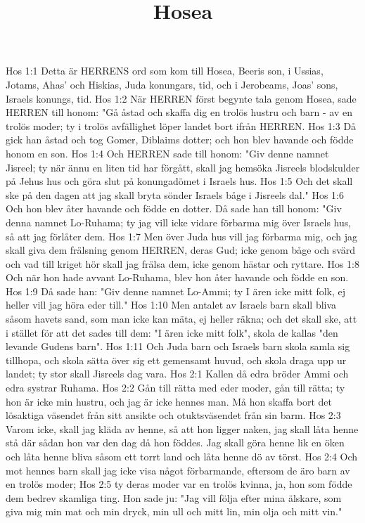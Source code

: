 

\title{Hosea}

Hos 1:1  Detta är HERRENS ord som kom till Hosea, Beeris son, i Ussias, Jotams, Ahas' och Hiskias, Juda konungars, tid, och i Jerobeams, Joas' sons, Israels konungs, tid.
Hos 1:2  När HERREN först begynte tala genom Hosea, sade HERREN till honom: "Gå åstad och skaffa dig en trolös hustru och barn - av en trolös moder; ty i trolös avfällighet löper landet bort ifrån HERREN.
Hos 1:3  Då gick han åstad och tog Gomer, Diblaims dotter; och hon blev havande och födde honom en son.
Hos 1:4  Och HERREN sade till honom: "Giv denne namnet Jisreel; ty när ännu en liten tid har förgått, skall jag hemsöka Jisreels blodskulder på Jehus hus och göra slut på konungadömet i Israels hus.
Hos 1:5  Och det skall ske på den dagen att jag skall bryta sönder Israels båge i Jisreels dal."
Hos 1:6  Och hon blev åter havande och födde en dotter. Då sade han till honom: "Giv denna namnet Lo-Ruhama; ty jag vill icke vidare förbarma mig över Israels hus, så att jag förlåter dem.
Hos 1:7  Men över Juda hus vill jag förbarma mig, och jag skall giva dem frälsning genom HERREN, deras Gud; icke genom båge och svärd och vad till kriget hör skall jag frälsa dem, icke genom hästar och ryttare.
Hos 1:8  Och när hon hade avvant Lo-Ruhama, blev hon åter havande och födde en son.
Hos 1:9  Då sade han: "Giv denne namnet Lo-Ammi; ty I ären icke mitt folk, ej heller vill jag höra eder till."
Hos 1:10  Men antalet av Israels barn skall bliva såsom havets sand, som man icke kan mäta, ej heller räkna; och det skall ske, att i stället för att det sades till dem: "I ären icke mitt folk", skola de kallas "den levande Gudens barn".
Hos 1:11  Och Juda barn och Israels barn skola samla sig tillhopa, och skola sätta över sig ett gemensamt huvud, och skola draga upp ur landet; ty stor skall Jisreels dag vara.
Hos 2:1  Kallen då edra bröder Ammi och edra systrar Ruhama.
Hos 2:2  Gån till rätta med eder moder, gån till rätta; ty hon är icke min hustru, och jag är icke hennes man. Må hon skaffa bort det lösaktiga väsendet från sitt ansikte och otuktsväsendet från sin barm.
Hos 2:3  Varom icke, skall jag kläda av henne, så att hon ligger naken, jag skall låta henne stå där sådan hon var den dag då hon föddes. Jag skall göra henne lik en öken och låta henne bliva såsom ett torrt land och låta henne dö av törst.
Hos 2:4  Och mot hennes barn skall jag icke visa något förbarmande, eftersom de äro barn av en trolös moder;
Hos 2:5  ty deras moder var en trolös kvinna, ja, hon som födde dem bedrev skamliga ting. Hon sade ju: "Jag vill följa efter mina älskare, som giva mig min mat och min dryck, min ull och mitt lin, min olja och mitt vin."
